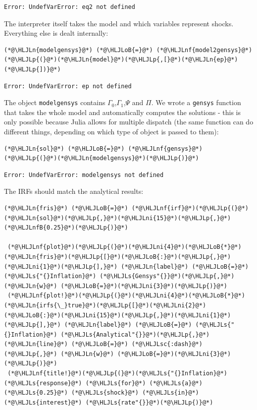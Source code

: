 \documentclass[12pt,a4paper]{article}
\newcommand{\HLJLn}[1]{#1}
\newcommand{\HLJLnf}[1]{\textcolor[RGB]{66,102,213}{#1}}
\newcommand{\HLJLs}[1]{\textcolor[RGB]{201,61,57}{#1}}
\newcommand{\HLJLsc}[1]{\textcolor[RGB]{201,61,57}{#1}}
\newcommand{\HLJLnfB}[1]{\textcolor[RGB]{59,151,46}{#1}}
\newcommand{\HLJLni}[1]{\textcolor[RGB]{59,151,46}{#1}}
\newcommand{\HLJLoB}[1]{\textcolor[RGB]{102,102,102}{\textbf{#1}}}
\newcommand{\HLJLp}[1]{#1}
\begin{document}
\begin{lstlisting}
Error: UndefVarError: eq2 not defined
\end{lstlisting}


The interpreter itself takes the model and which variables represent shocks. Everything else is dealt internally:


\begin{lstlisting}
(*@\HLJLn{modelgensys}@*) (*@\HLJLoB{=}@*) (*@\HLJLnf{model2gensys}@*)(*@\HLJLp{(}@*)(*@\HLJLn{model}@*)(*@\HLJLp{,[}@*)(*@\HLJLn{ep}@*)(*@\HLJLp{])}@*)
\end{lstlisting}

\begin{lstlisting}
Error: UndefVarError: ep not defined
\end{lstlisting}


The object \texttt{modelgensys} contains $\Gamma_0$,$\Gamma_1$,$\Psi$ and $\Pi$. We wrote a \texttt{gensys} function that takes the whole model and automatically computes the solutions - this is only possible because Julia allows for multiple dispatch (the same function can do different things, depending on which type of object is passed to them):


\begin{lstlisting}
(*@\HLJLn{sol}@*) (*@\HLJLoB{=}@*) (*@\HLJLnf{gensys}@*)(*@\HLJLp{(}@*)(*@\HLJLn{modelgensys}@*)(*@\HLJLp{)}@*)
\end{lstlisting}

\begin{lstlisting}
Error: UndefVarError: modelgensys not defined
\end{lstlisting}


The IRFs should match the analytical results:


\begin{lstlisting}
(*@\HLJLn{fris}@*) (*@\HLJLoB{=}@*) (*@\HLJLnf{irf}@*)(*@\HLJLp{(}@*)(*@\HLJLn{sol}@*)(*@\HLJLp{,}@*)(*@\HLJLni{15}@*)(*@\HLJLp{,}@*)(*@\HLJLnfB{0.25}@*)(*@\HLJLp{)}@*)

 (*@\HLJLnf{plot}@*)(*@\HLJLp{(}@*)(*@\HLJLni{4}@*)(*@\HLJLoB{*}@*)(*@\HLJLn{fris}@*)(*@\HLJLp{[}@*)(*@\HLJLoB{:}@*)(*@\HLJLp{,}@*)(*@\HLJLni{1}@*)(*@\HLJLp{],}@*) (*@\HLJLn{label}@*) (*@\HLJLoB{=}@*) (*@\HLJLs{"{}Inflation}@*) (*@\HLJLs{Gensys"{}}@*)(*@\HLJLp{,}@*) (*@\HLJLn{w}@*) (*@\HLJLoB{=}@*)(*@\HLJLni{3}@*)(*@\HLJLp{)}@*)
 (*@\HLJLnf{plot!}@*)(*@\HLJLp{(}@*)(*@\HLJLni{4}@*)(*@\HLJLoB{*}@*)(*@\HLJLn{irfs{\_}true}@*)(*@\HLJLp{[}@*)(*@\HLJLni{2}@*)(*@\HLJLoB{:}@*)(*@\HLJLni{15}@*)(*@\HLJLp{,}@*)(*@\HLJLni{1}@*)(*@\HLJLp{],}@*) (*@\HLJLn{label}@*) (*@\HLJLoB{=}@*) (*@\HLJLs{"{}Inflation}@*) (*@\HLJLs{Analytical"{}}@*)(*@\HLJLp{,}@*) (*@\HLJLn{line}@*) (*@\HLJLoB{=}@*) (*@\HLJLsc{:dash}@*)(*@\HLJLp{,}@*) (*@\HLJLn{w}@*) (*@\HLJLoB{=}@*)(*@\HLJLni{3}@*)(*@\HLJLp{)}@*)
 (*@\HLJLnf{title!}@*)(*@\HLJLp{(}@*)(*@\HLJLs{"{}Inflation}@*) (*@\HLJLs{response}@*) (*@\HLJLs{for}@*) (*@\HLJLs{a}@*) (*@\HLJLs{0.25}@*) (*@\HLJLs{shock}@*) (*@\HLJLs{in}@*) (*@\HLJLs{interest}@*) (*@\HLJLs{rate"{}}@*)(*@\HLJLp{)}@*)
\end{lstlisting}
\end{document}
